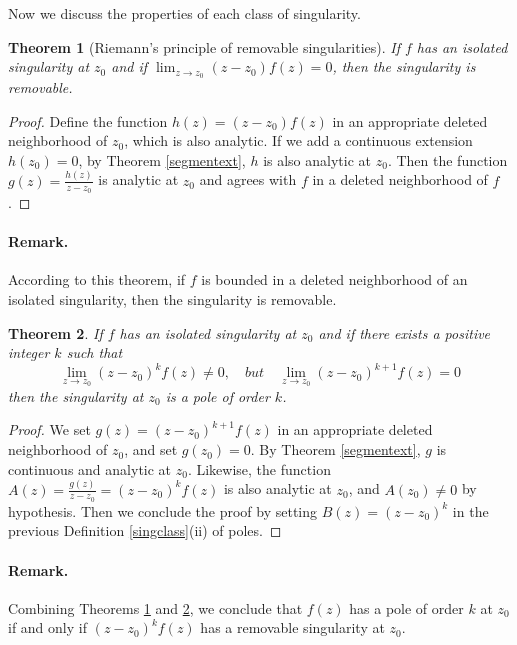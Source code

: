 \documentclass{article}
\numberwithin{equation}{section}
\theoremstyle{plain}
\newtheorem{theorem}{Theorem}[section]
\theoremstyle{definition}
\begin{document}
Now we discuss the properties of each class of singularity.
\begin{theorem}[Riemann’s principle of removable singularities]\label{removesing}
If $f$ has an isolated singularity at $z_0$ and if $\lim_{z\to z_0}(z-z_0) f(z)=0$, then the singularity is removable.
\end{theorem}
\begin{proof}
Define the function $h(z)=(z-z_0)f(z)$ in an appropriate deleted neighborhood of $z_0$, which is also analytic. If we add a continuous extension $h(z_0)=0$, by Theorem \ref{segmentext}, $h$ is also analytic at $z_0$. Then the function $g(z)=\frac{h(z)}{z-z_0}$ is analytic at $z_0$ and agrees with $f$ in a deleted neighborhood of $f$.
\end{proof}

\paragraph{Remark.} According to this theorem, if $f$ is bounded in a deleted neighborhood of an isolated singularity, then the singularity
is removable.

\begin{theorem}\label{polesing}
If $f$ has an isolated singularity at $z_0$ and if there exists a positive integer $k$ such that 
$$\lim_{z\to z_0}(z-z_0)^k f(z)\neq 0,\quad but\quad \lim_{z\to z_0}(z-z_0)^{k+1} f(z)=0$$ 
then the singularity at $z_0$ is a pole of order $k$.
\end{theorem}
\begin{proof}
We set $g(z)=(z-z_0)^{k+1}f(z)$ in an appropriate deleted neighborhood of $z_0$, and set $g(z_0)=0$. By Theorem \ref{segmentext}, $g$ is continuous and analytic at $z_0$. Likewise, the function $A(z)=\frac{g(z)}{z-z_0}=(z-z_0)^kf(z)$ is also analytic at $z_0$, and $A(z_0)\neq 0$ by hypothesis. Then we conclude the proof by setting $B(z)=(z-z_0)^k$ in the previous Definition \ref{singclass}(ii) of poles.
\end{proof}

\paragraph{Remark.} Combining Theorems \ref{removesing} and \ref{polesing}, we conclude that $f(z)$ has a pole of order $k$ at $z_0$ if and only if $(z-z_0)^kf(z)$ has a removable singularity at $z_0$.
\end{document}
